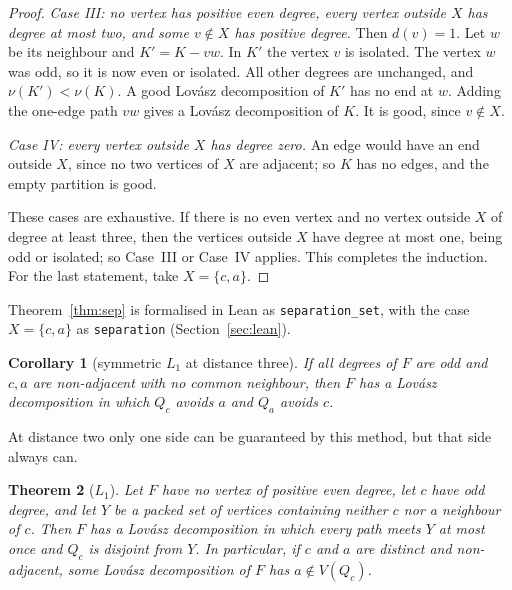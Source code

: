 \documentclass[11pt]{amsart}
\newtheorem{theorem}{Theorem}[section]
\newtheorem{corollary}[theorem]{Corollary}
\theoremstyle{definition}
\begin{document}
\begin{proof}
\emph{Case III: no vertex has positive even degree, every vertex outside $X$ has degree at most two,
and some $v\notin X$ has positive degree.} Then $d(v)=1$. Let $w$ be its neighbour and $K'=K-vw$. In
$K'$ the vertex $v$ is isolated. The vertex $w$ was odd, so it is now even or isolated. All other
degrees are unchanged, and $\nu(K')<\nu(K)$. A good Lov\'asz decomposition of $K'$ has no end at $w$.
Adding the one-edge path $vw$ gives a Lov\'asz decomposition of $K$. It is good, since $v\notin X$.

\emph{Case IV: every vertex outside $X$ has degree zero.} An edge would have an end outside $X$, since
no two vertices of $X$ are adjacent; so $K$ has no edges, and the empty partition is good.

These cases are exhaustive. If there is no even vertex and no vertex outside $X$ of degree at least
three, then the vertices outside $X$ have degree at most one, being odd or isolated; so Case~III or
Case~IV applies. This completes the induction. For the last statement, take $X=\{c,a\}$.
\end{proof}

Theorem~\ref{thm:sep} is formalised in Lean as \texttt{separation\_set}, with the case
$X=\{c,a\}$ as \texttt{separation} (Section~\ref{sec:lean}).

\begin{corollary}[symmetric $L_1$ at distance three]\label{cor:L1}
If all degrees of $F$ are odd and $c,a$ are non-adjacent with no common neighbour, then $F$ has a
Lov\'asz decomposition in which $Q_c$ avoids $a$ and $Q_a$ avoids $c$.
\end{corollary}

At distance two only one side can be guaranteed by this method, but that side always can.

\begin{theorem}[$L_1$]\label{thm:L1}
Let $F$ have no vertex of positive even degree, let $c$ have odd degree, and let $Y$ be a packed set of
vertices containing neither $c$ nor a neighbour of $c$. Then $F$ has a Lov\'asz decomposition in which
every path meets $Y$ at most once and $Q_c$ is disjoint from $Y$. In particular, if $c$ and $a$ are
distinct and non-adjacent, some Lov\'asz decomposition of $F$ has $a\notin V(Q_c)$.
\end{theorem}
\end{document}
